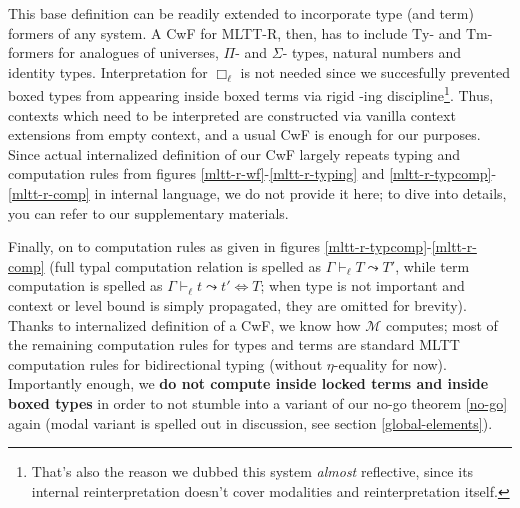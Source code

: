 This base definition can be readily extended to
incorporate type (and term) formers of any system. A CwF
for MLTT-R, then, has to include $\mathrm{Ty}$- and
$\mathrm{Tm}$- formers for analogues of universes,
$\Pi$- and $\Sigma$- types, natural numbers and identity
types. Interpretation for $\Box_\ell$ is not needed
since we succesfully prevented boxed types from
appearing inside boxed terms via rigid \faLock-ing
discipline\footnote{That's also the reason we dubbed
this system \textit{almost} reflective, since its
internal reinterpretation doesn't cover modalities and
reinterpretation itself.}. Thus, contexts which need to
be interpreted are constructed via vanilla context
extensions from empty context, and a usual CwF is
enough for our purposes. Since actual internalized
definition of our CwF largely repeats typing and
computation rules from figures
\ref{mltt-r-wf}-\ref{mltt-r-typing} and
\ref{mltt-r-typcomp}-\ref{mltt-r-comp} in internal
language, we do not provide it here; to dive into
details, you can refer to our supplementary materials.

Finally, on to computation rules as given in figures
\ref{mltt-r-typcomp}-\ref{mltt-r-comp} (full typal
computation relation is spelled as
$\Gamma\vdash_\ell T\leadsto T'$, while term computation
is spelled as $\Gamma\vdash_\ell t\leadsto t'
\Leftrightarrow T$; when type is not important and
context or level bound is simply propagated, they are
omitted for brevity). Thanks to internalized definition
of a CwF, we know how $\mathcal{M}$ computes; most of
the remaining computation rules for types and terms are
standard MLTT computation rules for bidirectional
typing (without $\eta$-equality for now). Importantly
enough, we \textbf{do not compute inside locked terms
and inside boxed types} in order to not stumble into a
variant of our no-go theorem \ref{no-go} again (modal
variant is spelled out in discussion, see section
\ref{global-elements}).

